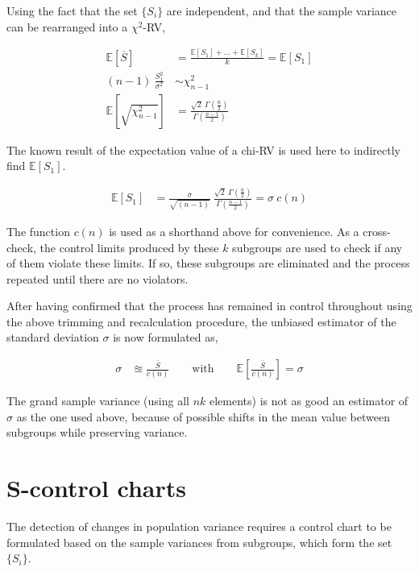 Using the fact that the set $ \{S_i\} $ are independent, and that the sample variance can be rearranged into a $ \chi^2 $-RV, 

\begin{align}
	\mathbb{E}[\overline{S}] &= \frac{\mathbb{E}[S_1] + \dots + \mathbb{E}[S_k]}{k} = \mathbb{E}[S_1] \\
	(n-1)\ \frac{S_1^2}{\sigma^2} &\sim \chi^2_{n-1} \\
	\mathbb{E}\left[\sqrt{\chi^2_{n-1}}\right] &= \frac{\sqrt{2}\ \Gamma(\tfrac{n}{2})}{\Gamma(\tfrac{n-1}{2})}
\end{align}

The known result of the expectation value of a chi-RV is used here to indirectly find $ \mathbb{E}[S_1] $.

\begin{align}
	\mathbb{E}[S_1] &= \frac{\sigma}{\sqrt{(n-1)}}\ \frac{\sqrt{2}\ \Gamma(\tfrac{n}{2})}{\Gamma(\tfrac{n-1}{2})} = \sigma\ c(n)
\end{align}

The function $ c(n) $ is used as a shorthand above for convenience. As a cross-check, the control limits produced by these $ k $ subgroups are used to check if any of them violate these limits. If so, these subgroups are eliminated and the process repeated until there are no violators.

After having confirmed that the process has remained in control throughout using the above trimming and recalculation procedure, the unbiased estimator of the standard deviation $ \sigma $ is now formulated as,

\begin{align}
	\sigma &\approxeq \frac{\overline{S}}{c(n)} \qquad \text{with} \qquad \mathbb{E}\left[\frac{\overline{S}}{c(n)}\right] = \sigma
\end{align}

The grand sample variance (using all $ nk $ elements) is not as good an estimator of $ \sigma $ as the one used above, because of possible shifts in the mean value between subgroups while preserving variance.

\section{S-control charts}

The detection of changes in population variance requires a control chart to be formulated based on the sample variances from subgroups, which form the set $ \{S_i\} $.

